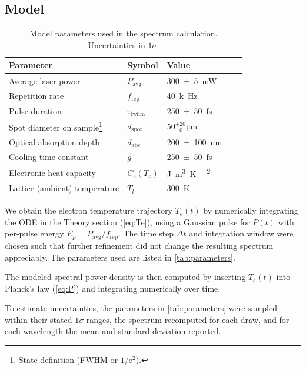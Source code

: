 \documentclass[
	parskip=half,
	a4paper,
]{scrarticle}
\begin{document}
\subsection{Model}
\begin{table}
    \centering
    \begin{tabular}{lllll}
        Parameter & Symbol & Value & \\
        \hline
        Average laser power & $P_{\text{avg}}$ & \SI{300(5)}{mW} &  &  \\
        Repetition rate & $f_{\text{rep}}$ & \SI{40}{k\hertz} &  &  \\
        Pulse duration & $\tau_\text{fwhm}$ & \SI{250(50)}{fs}& \\
        Spot diameter on sample\footnote{State definition (FWHM or $1/\mathrm e^2$).} & $d_{\text{spot}}$ & $50^{+20}_{-0}$\;\si{\micro\metre}\\
        Optical absorption depth & $d_{\text{abs}}$ & \SI{200(100)}{\nano\metre} & \cite{smauszDeterminationUVVisible2017} &  \\
        Cooling time constant & $g$ & \SI{250(50)}{fs} & \cite{stangeHotElectronCooling2015} &  \\
        Electronic heat capacity & $C_e(T_e)$ & \si{\joule\per\metre\cubed\per\kelvin\squared} & \cite{nihiraTemperatureDependenceLattice2003} &  \\
        Lattice (ambient) temperature & $T_l$ & \SI{300}{\kelvin} & &  \\
    \end{tabular}
    \caption{Model parameters used in the spectrum calculation. Uncertainties in $1\sigma$.}
    \label{tab:parameters}
\end{table}

We obtain the electron temperature trajectory $T_e(t)$ by numerically integrating the ODE in the Theory section (\autoref{eq:Te}), using a Gaussian pulse for $P(t)$ with per-pulse energy $E_p = P_{\text{avg}}/f_{\text{rep}}$. The time step $\Delta t$ and integration window were chosen such that further refinement did not change the resulting spectrum appreciably. The parameters used are listed in \autoref{tab:parameters}.

The modeled spectral power density is then computed by inserting $T_e(t)$ into Planck’s law (\autoref{eq:P}) and integrating numerically over time.

To estimate uncertainties, the parameters in \autoref{tab:parameters} were sampled within their stated $1\sigma$ ranges, the spectrum recomputed for each draw, and for each wavelength the mean and standard deviation reported.
\end{document}
